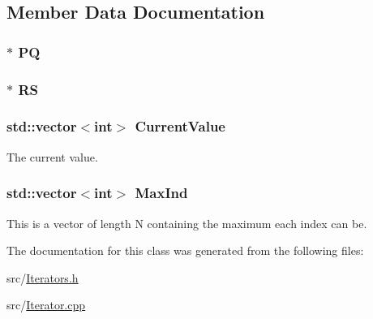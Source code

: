 \subsection{Member Data Documentation}
\hypertarget{classJKBuilder_1_1QuartetIterator_a84f5c3632fba19d3bb85e1cffb9e51f7}{
\subsubsection[{PQ}]{$\ast$ {\bf PQ}}}
\label{classJKBuilder_1_1QuartetIterator_a84f5c3632fba19d3bb85e1cffb9e51f7}
\hypertarget{classJKBuilder_1_1QuartetIterator_a26b777bf7ea22524f1cc725020ee2082}{
\subsubsection[{RS}]{$\ast$ {\bf RS}}}
\label{classJKBuilder_1_1QuartetIterator_a26b777bf7ea22524f1cc725020ee2082}
\hypertarget{classJKBuilder_1_1Iterator_a20ca24f6d827aba144bb087c4bcb74a0}{
\subsubsection[{CurrentValue}]{\setlength{\rightskip}{0pt plus 5cm}std::vector$<$int$>$ {\bf CurrentValue}}}
\label{classJKBuilder_1_1Iterator_a20ca24f6d827aba144bb087c4bcb74a0}


The current value. \hypertarget{classJKBuilder_1_1Iterator_ab6b56d3c4e9353bc938dd6249cde9ca0}{
\subsubsection[{MaxInd}]{\setlength{\rightskip}{0pt plus 5cm}std::vector$<$int$>$ {\bf MaxInd}}}
\label{classJKBuilder_1_1Iterator_ab6b56d3c4e9353bc938dd6249cde9ca0}


This is a vector of length N containing the maximum each index can be. 

The documentation for this class was generated from the following files:\begin{DoxyCompactItemize}
\item 
src/\hyperlink{Iterators_8h}{Iterators.h}\item 
src/\hyperlink{Iterator_8cpp}{Iterator.cpp}\end{DoxyCompactItemize}
